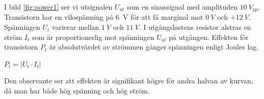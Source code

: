 I bild \ref{fig:power1} ser vi utsignalen \(U_{ut}\) som en sinussignal med amplituden
\(10\ V_{pp}\). Transistorn har en vilospänning på 6~V
för att få marginal mot \(0\ V\) och \(+12\ V\). Spänningen \(U_t\) varierar
mellan \(1\ V\) och \(11\ V\). I utgångslastens resistor alstras en ström \(I_t\) som är proportionerlig mot spänningen
\(U_{ut}\) på utgången. Effekten för transistorn \(P_t\) är absolutvärdet av strömmen gånger spänningen enligt Joules lag. 

\(P_t = \lvert U_t \cdot I_t \rvert\) 

Den observante ser att effekten är signifikant högre för andra halvan av kurvan, då man har både
hög spänning och hög ström.
